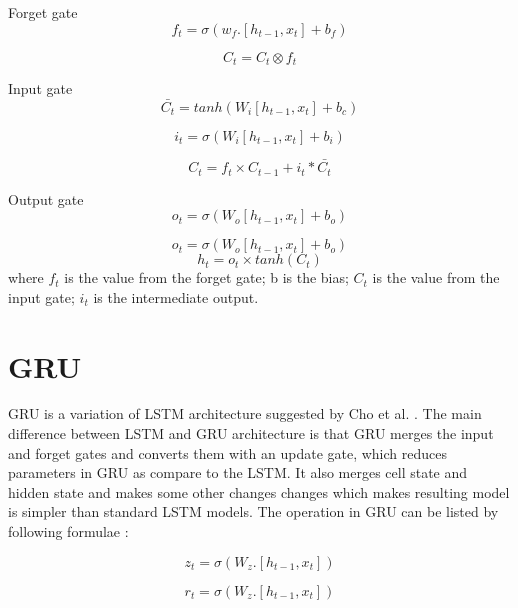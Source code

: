Forget gate
\begin{equation}
	f_t = \sigma(w_f.[h_{t-1}, x_t]+b_f)
\end{equation}

\begin{equation}
	C_t = C_t \otimes {f_t}
\end{equation}

Input gate
\begin{equation}
	\bar{C_t}= tanh(W_i[h_{t-1}, x_t]+b_c)
\end{equation}

\begin{equation}
	i_t= \sigma(W_i[h_{t-1}, x_t]+b_i)
\end{equation}

\begin{equation}
	C_t= f_t \times C_{t-1} + i_t * \bar{C_t}
\end{equation}


Output gate
\begin{equation}
	o_t= \sigma(W_o[h_{t-1}, x_t]+b_o)
\end{equation}

\begin{equation}
	o_t= \sigma(W_o[h_{t-1}, x_t]+b_o)
\end{equation}
\begin{equation}
	h_t= o_t \times tanh(C_t)
\end{equation}
where $f_t$ is the value from the forget gate; b is the bias; $C_t$ is the value from the input gate; $i_t$ is the intermediate output.

\section{GRU}
GRU is a variation of LSTM architecture suggested by Cho et al. \cite{cho2014properties}. The main difference between LSTM and GRU architecture is that GRU merges the input and forget gates and converts them with an update gate, which reduces parameters in GRU as compare to the LSTM. It also merges cell state and hidden state and makes some other changes changes which makes  resulting model is simpler than standard LSTM models. The operation in GRU can be listed by following formulae \cite{shahi2020stock}:

\begin{equation}
	z_t =  \sigma(W_z.[h_{t-1}, x_t])
\end{equation}

\begin{equation}
	r_t =  \sigma(W_z.[h_{t-1}, x_t])
\end{equation}

